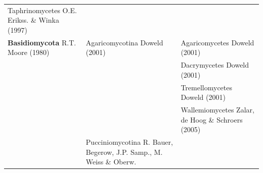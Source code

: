 \documentclass[]{book}
\begin{document}
\begin{longtable}[]{@{}lll@{}}
\begin{minipage}[t]{0.31\columnwidth}
Taphrinomycetes O.E. Erikss. \& Winka (1997)\strut
\end{minipage}\tabularnewline
\begin{minipage}[t]{0.32\columnwidth}\raggedright\strut
\textbf{Basidiomycota} R.T. Moore (1980)\strut
\end{minipage} & \begin{minipage}[t]{0.28\columnwidth}\raggedright\strut
Agaricomycotina Doweld (2001)\strut
\end{minipage} & \begin{minipage}[t]{0.31\columnwidth}\raggedright\strut
Agaricomycetes Doweld (2001)\strut
\end{minipage}\tabularnewline
\begin{minipage}[t]{0.32\columnwidth}\raggedright\strut
\strut
\end{minipage} & \begin{minipage}[t]{0.28\columnwidth}\raggedright\strut
\strut
\end{minipage} & \begin{minipage}[t]{0.31\columnwidth}\raggedright\strut
Dacrymycetes Doweld (2001)\strut
\end{minipage}\tabularnewline
\begin{minipage}[t]{0.32\columnwidth}\raggedright\strut
\strut
\end{minipage} & \begin{minipage}[t]{0.28\columnwidth}\raggedright\strut
\strut
\end{minipage} & \begin{minipage}[t]{0.31\columnwidth}\raggedright\strut
Tremellomycetes Doweld (2001)\strut
\end{minipage}\tabularnewline
\begin{minipage}[t]{0.32\columnwidth}\raggedright\strut
\strut
\end{minipage} & \begin{minipage}[t]{0.28\columnwidth}\raggedright\strut
\strut
\end{minipage} & \begin{minipage}[t]{0.31\columnwidth}\raggedright\strut
Wallemiomycetes Zalar, de Hoog \& Schroers (2005)\strut
\end{minipage}\tabularnewline
\begin{minipage}[t]{0.32\columnwidth}\raggedright\strut
\strut
\end{minipage} & \begin{minipage}[t]{0.28\columnwidth}\raggedright\strut
Pucciniomycotina R. Bauer, Begerow, J.P. Samp., M. Weiss \& Oberw.

\end{minipage}
\end{longtable}
\end{document}
